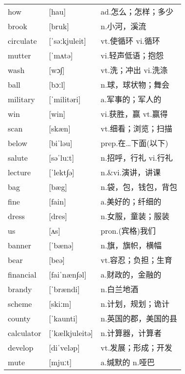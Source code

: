 \documentclass[a4paper]{article}
\begin{document}
\section{}
\begin{tabular}{l l l}

how & [hau] & ad.怎么；怎样；多少 \\
brook & [bruk] & n.小河，溪流 \\
circulate & [ˈsəːkjuleit] & vt.使循环 vi.循环 \\
mutter & [ˈmʌtə] & vi.轻声低语；抱怨 \\
wash & [wɔ∫] & vt.洗；冲出 vi.洗涤 \\
ball & [bɔːl] & n.球，球状物；舞会 \\
military & [ˈmilitəri] & a.军事的；军人的 \\
win & [win] & vi.获胜，赢 vt.赢得 \\
scan & [skæn] & vt.细看；浏览；扫描 \\
below & [biˈləu] & prep.在…下面(以下) \\
salute & [səˈluːt] & n.招呼，行礼 vi.行礼 \\
lecture & [ˈlekt∫ə] & n.\&vi.演讲，讲课 \\
bag & [bæg] & n.袋，包，钱包，背包 \\
fine & [fain] & a.美好的；纤细的 \\
dress & [dres] & n.女服，童装；服装 \\
us & [ʌs] & pron.(宾格)我们 \\
banner & [ˈbænə] & n.旗，旗帜，横幅 \\
bear & [beə] & vt.容忍；负担；生育 \\
financial & [faiˈnæn∫əl] & a.财政的，金融的 \\
brandy & [ˈbrændi] & n.白兰地酒 \\
scheme & [skiːm] & n.计划，规划；诡计 \\
county & [ˈkaunti] & n.英国的郡，美国的县 \\
calculator & [ˈkælkjuleitə] & n.计算器，计算者 \\
develop & [diˈveləp] & vt.发展；形成；开发 \\
mute & [mjuːt] & a.缄默的 n.哑巴 \\

\end{tabular}
\end{document}
